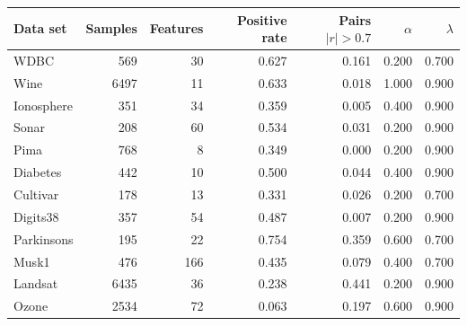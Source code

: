 \begin{tabular}{lrrrrrr}
\toprule
Data set & Samples & Features & Positive rate & Pairs $|r|>0.7$ & $\alpha$ & $\lambda$ \\
\midrule
WDBC & 569 & 30 & 0.627 & 0.161 & 0.200 & 0.700 \\
Wine & 6497 & 11 & 0.633 & 0.018 & 1.000 & 0.900 \\
Ionosphere & 351 & 34 & 0.359 & 0.005 & 0.400 & 0.900 \\
Sonar & 208 & 60 & 0.534 & 0.031 & 0.200 & 0.900 \\
Pima & 768 & 8 & 0.349 & 0.000 & 0.200 & 0.900 \\
Diabetes & 442 & 10 & 0.500 & 0.044 & 0.400 & 0.900 \\
Cultivar & 178 & 13 & 0.331 & 0.026 & 0.200 & 0.700 \\
Digits38 & 357 & 54 & 0.487 & 0.007 & 0.200 & 0.900 \\
Parkinsons & 195 & 22 & 0.754 & 0.359 & 0.600 & 0.700 \\
Musk1 & 476 & 166 & 0.435 & 0.079 & 0.400 & 0.700 \\
Landsat & 6435 & 36 & 0.238 & 0.441 & 0.200 & 0.900 \\
Ozone & 2534 & 72 & 0.063 & 0.197 & 0.600 & 0.900 \\
\bottomrule
\end{tabular}
